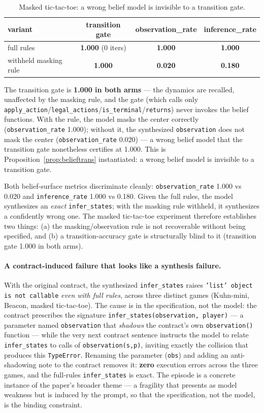 \documentclass[11pt]{article}
\theoremstyle{remark}
\begin{document}
\begin{table}[ht]
\centering
\small
\begin{tabular}{lccc}
\toprule
variant & transition gate & observation\_rate & inference\_rate \\
\midrule
full rules & \textbf{1.000} (0 iters) & \textbf{1.000} & \textbf{1.000} \\
withheld masking rule & \textbf{1.000} & \textbf{0.020} & \textbf{0.180} \\
\bottomrule
\end{tabular}
\caption{Masked tic-tac-toe: a wrong belief model is invisible to a transition gate.}
\label{tab:mtt}
\end{table}

The transition gate is \textbf{1.000 in both arms} --- the dynamics are recalled, unaffected by the masking rule, and the gate (which calls only \texttt{apply\_action}/\texttt{legal\_actions}/\texttt{is\_terminal}/\texttt{returns}) never invokes the belief functions. With the rule, the model masks the center correctly (\texttt{observation\_rate} 1.000); without it, the synthesized \texttt{observation} does not mask the center (\texttt{observation\_rate} 0.020) --- a wrong belief model that the transition gate nonetheless certifies at 1.000. This is Proposition~\ref{prop:belieftrans} instantiated: a wrong belief model is invisible to a transition gate.

Both belief-surface metrics discriminate cleanly: \texttt{observation\_rate} 1.000 vs 0.020 and \texttt{inference\_rate} 1.000 vs 0.180. Given the full rules, the model synthesizes an \emph{exact} \texttt{infer\_states}; with the masking rule withheld, it synthesizes a confidently wrong one. The masked tic-tac-toe experiment therefore establishes two things: (a) the masking/observation rule is not recoverable without being specified, and (b) a transition-accuracy gate is structurally blind to it (transition gate 1.000 in both arms).

\paragraph{A contract-induced failure that looks like a synthesis failure.} With the original contract, the synthesized \texttt{infer\_states} raises \texttt{'list' object is not callable} \emph{even with full rules}, across three distinct games (Kuhn-mini, Beacon, masked tic-tac-toe). The cause is in the specification, not the model: the contract prescribes the signature \texttt{infer\_states(observation, player)} --- a parameter named \texttt{observation} that \emph{shadows} the contract's own \texttt{observation()} function --- while the very next contract sentence instructs the model to relate \texttt{infer\_states} to calls of \texttt{observation(s,p)}, inviting exactly the collision that produces this \texttt{TypeError}. Renaming the parameter (\texttt{obs}) and adding an anti-shadowing note to the contract removes it: \textbf{zero} execution errors across the three games, and the full-rules \texttt{infer\_states} is exact. The episode is a concrete instance of the paper's broader theme --- a fragility that presents as model weakness but is induced by the prompt, so that the specification, not the model, is the binding constraint.
\end{document}
